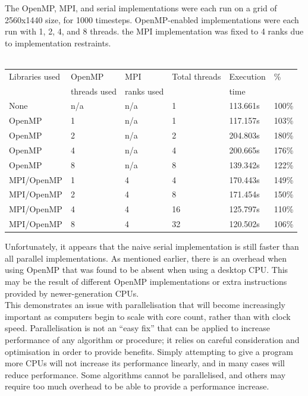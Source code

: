 \documentclass[11pt,a4paper]{report}
\begin{document}
The OpenMP, MPI, and serial implementations were each run on a grid of
2560x1440 size, for 1000 timesteps. OpenMP-enabled implementations were each
run with 1, 2, 4, and 8 threads. the MPI implementation was fixed to 4 ranks
due to implementation restraints.\\
\\
\begin{tabular}{| l | l | l | l | l | l |}
\hline
Libraries used & OpenMP & MPI  & Total threads & Execution & \% \\
 & threads used & ranks used & & time  & \\ \hline
None & n/a & n/a & 1 & 113.661s & 100\% \\ \hline
OpenMP & 1 & n/a & 1 & 117.157s & 103\% \\ \hline
OpenMP & 2 & n/a & 2 & 204.803s & 180\% \\ \hline
OpenMP & 4 & n/a & 4 & 200.665s & 176\% \\ \hline
OpenMP & 8 & n/a & 8 & 139.342s & 122\% \\ \hline
MPI/OpenMP & 1 & 4 & 4 & 170.443s & 149\% \\ \hline
MPI/OpenMP & 2 & 4 & 8 & 171.454s & 150\% \\ \hline
MPI/OpenMP & 4 & 4 & 16 & 125.797s & 110\% \\ \hline
MPI/OpenMP & 8 & 4 & 32 & 120.502s & 106\% \\ \hline
\end{tabular}

\newpage
Unfortunately, it appears that the naive serial implementation is still faster
than all parallel implementations. As mentioned earlier, there is an overhead
when using OpenMP that was found to be absent when using a desktop CPU. This
may be the result of different OpenMP implementations or extra instructions
provided by newer-generation CPUs.\\

This demonstrates an issue with parallelisation that will become increasingly
important as computers begin to scale with core count, rather than with
clock speed. Parallelisation is not an ``easy fix'' that can be applied to
increase performance of any algorithm or procedure; it relies on careful
consideration and optimisation in order to provide benefits. Simply attempting
to give a program more CPUs will not increase its performance linearly, and in
many cases will reduce performance. Some algorithms cannot be parallelised, and
others may require too much overhead to be able to provide a performance
increase.\\
\end{document}
